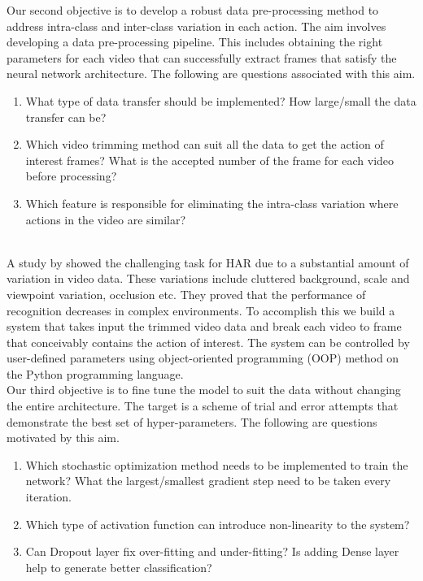Our second objective is to develop a robust data pre-processing method to address intra-class and inter-class variation in each action.
The aim involves developing a data pre-processing pipeline. This includes obtaining the right parameters for each video that can successfully extract frames that satisfy the neural network architecture. The following are questions associated with this aim.
\begin{enumerate}
    \item What type of data transfer should be implemented? How large/small the data transfer can be?  
    \item Which video trimming method can suit all the data to get the action of interest frames? What is the accepted number of the frame for each video before processing? 
    \item Which feature is responsible for eliminating the intra-class variation where actions in the video are similar?
    \end{enumerate}\\
A study by  \cite{nazir2017inter} showed the challenging task for HAR due to a substantial amount of variation in video data. These variations include cluttered background, scale and viewpoint variation, occlusion etc. They proved that the performance of recognition decreases in complex environments. To accomplish this we build a system that takes input the trimmed video data and break each video to frame that conceivably contains the action of interest. The system can be controlled by user-defined parameters using object-oriented programming (OOP) method on the Python programming language.\\

Our third objective is to fine tune the model to suit the data without changing the entire architecture.
The target is a scheme of trial and error attempts that demonstrate the best set of hyper-parameters. The following are questions motivated by this aim.
\begin{enumerate}
    \item Which stochastic optimization method needs to be implemented to train the network? What the largest/smallest gradient step need to be taken every iteration.
    \item Which type of activation function can introduce non-linearity to the system? 
    \item Can Dropout layer fix over-fitting and under-fitting? Is adding Dense layer help to generate better classification?
    \end{enumerate}\\
    
